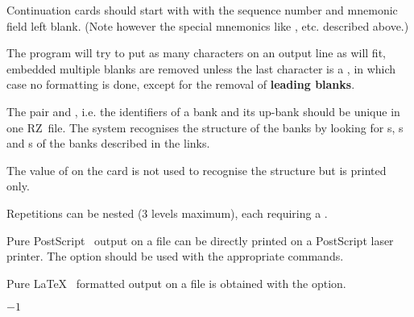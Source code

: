 \newpage

{\samepage \clearpage \begin{Notes}\item Continuation cards should start with  with the 
      sequence number and mnemonic field
      left blank. (Note however the special mnemonics like 
      ,  etc. described above.)
\item The program will try to put as many characters on an output line 
      as will fit, embedded multiple blanks are removed unless the last 
      character is a , in
      which case no formatting is done, except for the removal of 
      {\bf leading blanks}.
\item The pair  and , i.e. the identifiers of a 
      bank and its up-bank should be unique in one RZ~file. 
            The system recognises the structure of the banks by looking for 
      s, s and s of the banks described 
      in the links. 
\item The value of  on the card 
      is not used to recognise the structure but is printed only.
\item Repetitions can be nested (3 levels maximum), 
      each  requiring a .
\end{Notes}
}


\newpage

{\samepage \clearpage \begin{ULc}\item Pure PostScript~\cite{Adobe:red2} output on a file  can be
      directly printed on a PostScript laser printer.
      The  option should be used with the appropriate commands.
\item Pure \LaTeX~\cite{bib-LATEX} formatted output on a file  
      is obtained with the  option.
\end{ULc}
}


\newpage

{\samepage \clearpage $-1$
}


